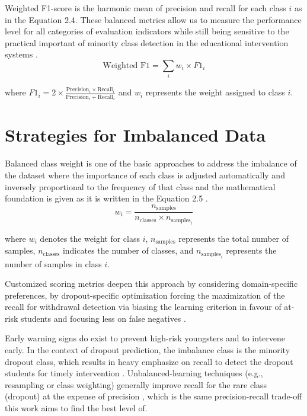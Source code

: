 \documentclass[ %
                    author={Carlos Duran Calle},
                supervisor={Dr. Felipe Campelo},
                    degree={MSc},
                     title={Comparative Machine Learning Analysis for Student Dropout Prediction in a Virtual Learning Environment},
                  subtitle={Incorporating Student Engagement and Socio-Economic Features},
                      type={},
                      year={2025}]{dissertation}
\begin{document}
Weighted F1-score is the harmonic mean of precision and recall for each class $i$ \cite{tantisripreecha_novel_2022} \cite{opitz_closer_2024} as in the Equation 2.4. These balanced metrics allow us to measure the performance level for all categories of evaluation indicators while still being sensitive to the practical important of minority class detection in the educational intervention systems \cite{krawczyk_learning_2016}.
\begin{equation}
	\text{Weighted F1} = \sum_{i} w_{i} \times F1_{i}
	\tag{2.4}
\end{equation}
\begin{center}
	where $F1_{i} = 2 \times \frac{\text{Precision}_{i} \times \text{Recall}_{i}}{\text{Precision}_{i} + \text{Recall}_{i}}$ 
	and $w_{i}$ represents the weight assigned to class $i$.
\end{center}

\section{Strategies for Imbalanced Data}
Balanced class weight is one of the basic approaches to address the imbalance of the dataset where the importance of each class is adjusted automatically and inversely proportional to the frequency of that class and the mathematical foundation is given as it is written in the Equation 2.5 \cite{akor_hierarchical_2025}.
\begin{equation}
	w_{i} = \frac{n_{\text{samples}}}{n_{\text{classes}} \times n_{\text{samples}_{i}}}
	\tag{2.5}
\end{equation}
\begin{center}
	where $w_{i}$ denotes the weight for class $i$, $n_{\text{samples}}$ represents the total number of samples, 
	$n_{\text{classes}}$ indicates the number of classes, and $n_{\text{samples}_{i}}$ represents the number of samples in class $i$.
\end{center}

Customized scoring metrics deepen this approach by considering domain-specific preferences, by dropout-specific optimization forcing the maximization of the recall for withdrawal detection via biasing the learning criterion in favour of at-risk students and focusing less on false negatives \cite{orooji_predicting_2019}.

Early warning signs do exist to prevent high-risk youngsters and to intervene early. In the context of dropout prediction, the imbalance class is the minority dropout class, which results in heavy emphasize on recall to detect the dropout students for timely intervention \cite{lee_machine_2019}. Unbalanced-learning techniques (e.g., resampling or class weighting) generally improve recall for the rare class (dropout) at the expense of precision \cite{orooji_predicting_2019}, which is the same precision-recall trade-off this work aims to find the best level of.
\end{document}
